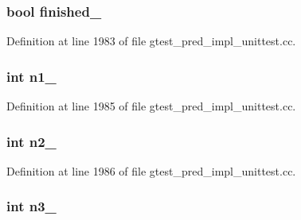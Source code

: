 \hypertarget{classPredicate5Test_a9189d6cfedf2ace6f5f6aa152ba38f83}{
\subsubsection[{finished\-\_\-}]{\setlength{\rightskip}{0pt plus 5cm}bool {\bf finished\-\_\-}}}\label{d3/d98/classPredicate5Test_a9189d6cfedf2ace6f5f6aa152ba38f83}


\-Definition at line 1983 of file gtest\-\_\-pred\-\_\-impl\-\_\-unittest.\-cc.

\hypertarget{classPredicate5Test_a7a61c539c18d10f12696fc25b115d699}{
\subsubsection[{n1\-\_\-}]{\setlength{\rightskip}{0pt plus 5cm}int {\bf n1\-\_\-}}}\label{d3/d98/classPredicate5Test_a7a61c539c18d10f12696fc25b115d699}


\-Definition at line 1985 of file gtest\-\_\-pred\-\_\-impl\-\_\-unittest.\-cc.

\hypertarget{classPredicate5Test_a7dc886196252de63d1ca064997069377}{
\subsubsection[{n2\-\_\-}]{\setlength{\rightskip}{0pt plus 5cm}int {\bf n2\-\_\-}}}\label{d3/d98/classPredicate5Test_a7dc886196252de63d1ca064997069377}


\-Definition at line 1986 of file gtest\-\_\-pred\-\_\-impl\-\_\-unittest.\-cc.

\hypertarget{classPredicate5Test_a08d9124d5401436eacd3e57dae0dbe2f}{
\subsubsection[{n3\-\_\-}]{\setlength{\rightskip}{0pt plus 5cm}int {\bf n3\-\_\-}}}\label{d3/d98/classPredicate5Test_a08d9124d5401436eacd3e57dae0dbe2f}


